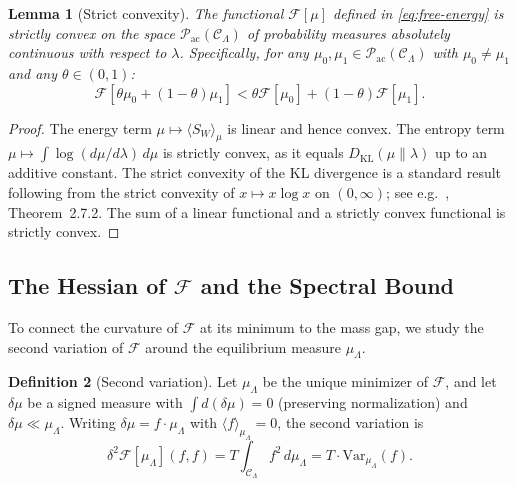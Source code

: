 \documentclass[12pt,a4paper]{article}
\theoremstyle{definition}
\newtheorem{definition}{Definition}[section]
\theoremstyle{plain}
\newtheorem{lemma}[definition]{Lemma}
\theoremstyle{remark}
\begin{document}
\begin{lemma}[Strict convexity]
\label{lem:strict-convexity}
The functional $\mathcal{F}[\mu]$ defined in \eqref{eq:free-energy} is strictly convex on the space $\mathcal{P}_{\mathrm{ac}}(\mathcal{C}_\Lambda)$ of probability measures absolutely continuous with respect to $\lambda$. Specifically, for any $\mu_0, \mu_1 \in \mathcal{P}_{\mathrm{ac}}(\mathcal{C}_\Lambda)$ with $\mu_0 \neq \mu_1$ and any $\theta \in (0,1)$:
\begin{equation}
    \mathcal{F}[\theta \mu_0 + (1-\theta)\mu_1] < \theta \mathcal{F}[\mu_0] + (1-\theta) \mathcal{F}[\mu_1].
\end{equation}
\end{lemma}

\begin{proof}
The energy term $\mu \mapsto \langle S_W \rangle_\mu$ is linear and hence convex. The entropy term $\mu \mapsto \int \log(d\mu/d\lambda)\, d\mu$ is strictly convex, as it equals $D_{\mathrm{KL}}(\mu \| \lambda)$ up to an additive constant. The strict convexity of the KL divergence is a standard result following from the strict convexity of $x \mapsto x \log x$ on $(0, \infty)$; see e.g.\ \cite{CoverThomas2006}, Theorem~2.7.2. The sum of a linear functional and a strictly convex functional is strictly convex.
\end{proof}

\subsection{The Hessian of $\mathcal{F}$ and the Spectral Bound}

To connect the curvature of $\mathcal{F}$ at its minimum to the mass gap, we study the second variation of $\mathcal{F}$ around the equilibrium measure $\mu_\Lambda$.

\begin{definition}[Second variation]
\label{def:second-variation}
Let $\mu_\Lambda$ be the unique minimizer of $\mathcal{F}$, and let $\delta\mu$ be a signed measure with $\int d(\delta\mu) = 0$ (preserving normalization) and $\delta\mu \ll \mu_\Lambda$. Writing $\delta\mu = f \cdot \mu_\Lambda$ with $\langle f \rangle_{\mu_\Lambda} = 0$, the second variation is
\begin{equation}\label{eq:hessian}
    \delta^2 \mathcal{F}[\mu_\Lambda](f,f) = T \int_{\mathcal{C}_\Lambda} f^2\, d\mu_\Lambda = T \cdot \mathrm{Var}_{\mu_\Lambda}(f).
\end{equation}
\end{definition}
\end{document}
